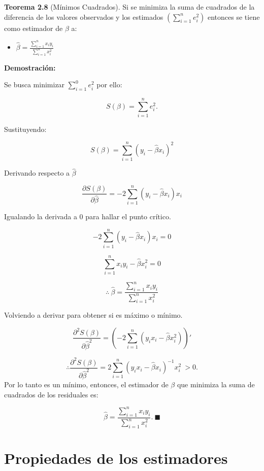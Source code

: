 \documentclass[
  a4paper,
  oneside,
  openany]{book}
\providecommand{\tightlist}{%
  \setlength{\itemsep}{0pt}\setlength{\parskip}{0pt}}
\begin{document}
\textbf{Teorema 2.8} (Mínimos Cuadrados).
Si se minimiza la suma de cuadrados de la diferencia de los valores observados y los estimados \(\left(\sum_{i=1}^{n}e_{i}^2\right)\) entonces se tiene como estimador de \(\beta\) a:

\begin{itemize}
\tightlist
\item
  \(\hat{\beta}=\frac{\sum_{i=1}^{n}x_{i}y_{i}}{\sum_{i=1}^{n}x_{i}^2}\)
\end{itemize}

\textbf{Demostración:}

Se busca minimizar \(\sum_{i=1}^{0}e_{i}^2\) por ello:

\[S(\beta)=\sum_{i=1}^{n}e_{i}^2.\]

Sustituyendo:

\[S(\beta)=\sum_{i=1}^{n}\left( y_{i}-\hat{\beta}x_{i}\right)^2\]

Derivando respecto a \(\hat{\beta}\)

\[\frac{\partial S(\beta)}{\partial \hat{\beta}}=-2\sum_{i=1}^{n}\left(y_{i}-\hat{\beta}x_{i}\right)x_{i}\]

Igualando la derivada a 0 para hallar el punto crítico.

\[-2\sum_{i=1}^{n}\left(y_{i}-\hat{\beta}x_{i}\right)x_{i}=0\]

\[\sum_{i=1}^{n}x_{i}y_{i}-\hat{\beta}x_{i}^2=0\]

\[\therefore \ \hat{\beta}=\frac{\sum_{i=1}^{n}x_{i}y_{i}}{\sum_{i=1}^{n}x_{i}^2}\]

Volviendo a derivar para obtener si es máximo o mínimo.

\[\frac{\partial^2 S(\beta)}{\partial \hat{\beta}^2}=\left(-2\sum_{i=1}^{n}\left(y_{i}x_{i}-\hat{\beta}x_{i}^2\right)\right)'\]

\[\therefore \frac{\partial^2 S(\beta)}{\partial \hat{\beta}^2}=2\sum_{i=1}^{n}\left(y_{i}x_{i}-\hat{\beta}x_{i}\right)^{-1}x_{i}^2 \ > 0.\]
Por lo tanto es un mínimo, entonces, el estimador de \(\beta\) que minimiza la suma de cuadrados de los residuales es:

\[\hat{\beta}=\frac{\sum_{i=1}^{n}x_{i}y_{i}}{\sum_{i=1}^{n}x_{i}^2}. \ \blacksquare\]

\hypertarget{propiedades-de-los-estimadores-1}{%
\section{Propiedades de los estimadores}\label{propiedades-de-los-estimadores-1}}
\end{document}
